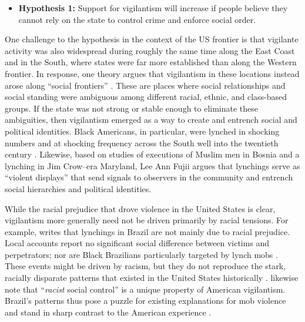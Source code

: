 \documentclass[12pt,a4paper]{article}
\begin{document}
\begin{itemize}
  \item \textbf{Hypothesis 1:} Support for vigilantism will increase if people believe they cannot rely on the state to control crime and enforce social order.
\end{itemize}

One challenge to the hypothesis in the context of the US frontier is that vigilante activity was also widespread during roughly the same time along the East Coast and in the South, where states were far more established than along the Western frontier. In response, one theory argues that vigilantism in these locations instead arose along ``social frontiers'' \citep{obert2018keeping}. These are places where social relationships and social standing were ambiguous among different racial, ethnic, and class-based groups. If the state was not strong or stable enough to eliminate these ambiguities, then vigilantism emerged as a way to create and entrench social and political identities. Black Americans, in particular, were lynched in shocking numbers and at shocking frequency across the South well into the twentieth century \citep{dray2003hands,seguin2019national}. Likewise, based on studies of executions of Muslim men in Bosnia and a lynching in Jim Crow--era Maryland, Lee Ann Fujii \citeyearpar{fujii2017talk} argues that lynchings serve as ``violent displays'' that send signals to observers in the community and entrench social hierarchies and political identities.

While the racial prejudice that drove violence in the United States is clear, vigilantism more generally need not be driven primarily by racial tensions. For example, \citet{martins2015linchamentos} writes that lynchings in Brazil are not mainly due to racial prejudice. Local accounts report no significant social difference between victims and perpetrators; nor are Black Brazilians particularly targeted by lynch mobs \citep{band2015rocinha, pearson2018latam, sinhoretto2009linchamentos}. These events might be driven by racism, but they do not reproduce the stark, racially disparate patterns that existed in the United States historically \citep[23]{martins2015linchamentos}. \citet[8]{jung2020lynching} likewise note that ``\textit{racist} social control'' is a unique property of American vigilantism. Brazil's patterns thus pose a puzzle for existing explanations for mob violence and stand in sharp contrast to the American experience \citep{smaangs2016doing, wood2011lynching}. 
\end{document}
